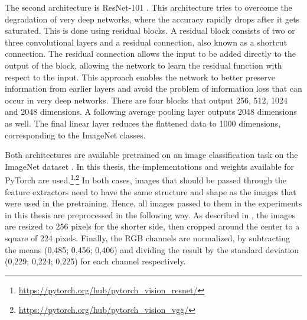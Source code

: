 The second architecture is ResNet-101 \citep{He2016}.
This architecture tries to overcome the degradation of very deep networks, where the accuracy rapidly drops after it gets saturated.
This is done using residual blocks.
A residual block consists of two or three convolutional layers and a residual connection, also known as a shortcut connection.
The residual connection allows the input to be added directly to the output of the block, allowing the network to learn the residual function with respect to the input.
This approach enables the network to better preserve information from earlier layers and avoid the problem of information loss that can occur in very deep networks.
There are four blocks that output 256, 512, 1024 and 2048 dimensions.
A following average pooling layer outputs 2048 dimensions as well.
The final linear layer reduces the flattened data to 1000 dimensions, corresponding to the ImageNet classes.

Both architectures are available pretrained on an image classification task on the ImageNet dataset \citep{Deng2009}.
In this thesis, the implementations and weights available for PyTorch are used.\footnote{\href{https://pytorch.org/hub/pytorch\_vision\_resnet/}{https://pytorch.org/hub/pytorch\_vision\_resnet/}}\textsuperscript{,}\footnote{\href{https://pytorch.org/hub/pytorch\_vision\_vgg/}{https://pytorch.org/hub/pytorch\_vision\_vgg/}}
In both cases, images that should be passed through the feature extractors need to have the same structure and shape as the images that were used in the pretraining.
Hence, all images passed to them in the experiments in this thesis are preprocessed in the following way.
As described in \citep{He2016,Simonyan2015}, the images are resized to 256 pixels for the shorter side, then cropped around the center to a square of 224 pixels.
Finally, the RGB channels are normalized, by subtracting the means (0,485; 0,456; 0,406) and dividing the result by the standard deviation (0,229; 0,224; 0,225) for each channel respectively.

